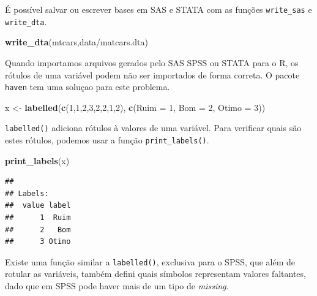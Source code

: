 \documentclass[
]{book}
\newenvironment{Shaded}{\begin{snugshade}}{\end{snugshade}}
\newcommand{\DataTypeTok}[1]{\textcolor[rgb]{0.13,0.29,0.53}{#1}}
\newcommand{\DecValTok}[1]{\textcolor[rgb]{0.00,0.00,0.81}{#1}}
\newcommand{\KeywordTok}[1]{\textcolor[rgb]{0.13,0.29,0.53}{\textbf{#1}}}
\newcommand{\NormalTok}[1]{#1}
\newcommand{\StringTok}[1]{\textcolor[rgb]{0.31,0.60,0.02}{#1}}
\begin{document}
É possível salvar ou escrever bases em SAS e STATA com as funções \texttt{write\_sas} e \texttt{write\_dta}.

\begin{Shaded}
\begin{Highlighting}[]
\KeywordTok{write\_dta}\NormalTok{(mtcars,}\StringTok{\textquotesingle{}data/matcars.dta\textquotesingle{}}\NormalTok{)}
\end{Highlighting}
\end{Shaded}

Quando importamos arquivos gerados pelo SAS SPSS ou STATA para o R, os rótulos de uma variável podem não ser importados de forma correta. O pacote \texttt{haven} tem uma soluçao para este problema.

\begin{Shaded}
\begin{Highlighting}[]
\NormalTok{x <{-}}\StringTok{ }\KeywordTok{labelled}\NormalTok{(}\KeywordTok{c}\NormalTok{(}\DecValTok{1}\NormalTok{,}\DecValTok{1}\NormalTok{,}\DecValTok{2}\NormalTok{,}\DecValTok{3}\NormalTok{,}\DecValTok{2}\NormalTok{,}\DecValTok{2}\NormalTok{,}\DecValTok{1}\NormalTok{,}\DecValTok{2}\NormalTok{), }\KeywordTok{c}\NormalTok{(}\DataTypeTok{Ruim =} \DecValTok{1}\NormalTok{, }\DataTypeTok{Bom =} \DecValTok{2}\NormalTok{, }\DataTypeTok{Otimo =} \DecValTok{3}\NormalTok{))}
\end{Highlighting}
\end{Shaded}

\texttt{labelled()} adiciona rótulos à valores de uma variável. Para verificar quais são estes rótulos, podemos usar a função \texttt{print\_labels()}.

\begin{Shaded}
\begin{Highlighting}[]
\KeywordTok{print\_labels}\NormalTok{(x)}
\end{Highlighting}
\end{Shaded}

\begin{verbatim}
## 
## Labels:
##  value label
##      1  Ruim
##      2   Bom
##      3 Otimo
\end{verbatim}

Existe uma função similar a \texttt{labelled()}, exclusiva para o SPSS, que além de rotular as variáveis, também defini quais símbolos representam valores faltantes, dado que em SPSS pode haver mais de um tipo de \emph{missing}.
\end{document}
